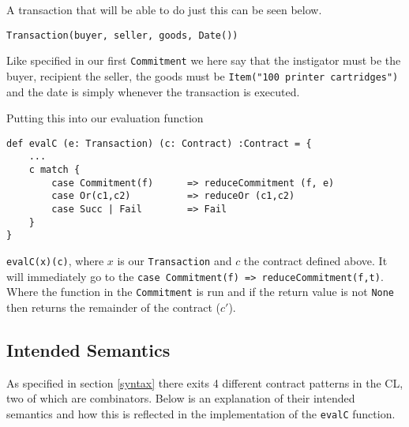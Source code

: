 \documentclass{ituthesis}
\begin{document}
A transaction that will be able to do just this can be seen below.
\begin{lstlisting}
Transaction(buyer, seller, goods, Date())
\end{lstlisting}{}
Like specified in our first \texttt{Commitment} we here say that the instigator must be the buyer, recipient the seller, the goods must be \texttt{Item("100 printer cartridges")} and the date is simply whenever the transaction is executed.

Putting this into our evaluation function 
\begin{lstlisting}
def evalC (e: Transaction) (c: Contract) :Contract = { 
    ...
    c match {
        case Commitment(f)      => reduceCommitment (f, e)
        case Or(c1,c2)          => reduceOr (c1,c2)
        case Succ | Fail        => Fail
    }
}
\end{lstlisting}
\texttt{evalC(x)(c)}, where $x$ is our \texttt{Transaction} and $c$ the contract defined above. It will immediately go to the \texttt{case Commitment(f) => reduceCommitment(f,t)}. Where the function in the \texttt{Commitment} is run and if the return value is not \texttt{None} then returns the remainder of the contract ($c'$).

\subsection{Intended Semantics}

As specified in section \ref{syntax} there exits 4 different contract patterns in the CL, two of which are combinators. Below is an explanation of their intended semantics and how this is reflected in the implementation of the \texttt{evalC} function.
\end{document}
